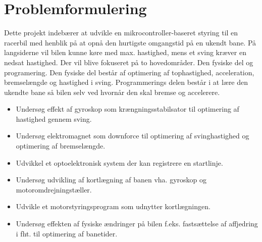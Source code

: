 
\section{Problemformulering}
Dette projekt indebærer at udvikle en mikrocontroller-baseret styring til en racerbil med henblik på at opnå den hurtigste omgangstid på en ukendt bane.
På langsiderne vil bilen kunne køre med max. hastighed, mens et sving kræver en nedsat hastighed.
Der vil blive fokuseret på to hovedområder. Den fysiske del og programering. Den fysiske del består af optimering af tophastighed, acceleration, bremselængde og hastighed i sving.
Programmerings delen består i at lære den ukendte bane så bilen selv ved hvornår den skal bremse og accelerere.
\begin{itemize}
\item Undersøg effekt af gyroskop som krængningsstabilsator til optimering af hastighed gennem sving.
\item Undersøg elektromagnet som downforce til optimering af svinghastighed og optimering af bremselængde.
\item Udvikkel et optoelektronisk system der kan registrere en startlinje.
\item Undersøg udvikling af kortlægning af banen vha. gyroskop og motoromdrejningstæller.
\item Udvikle et motorstyringsprogram som udnytter kortlægningen.
\item Undersøg effekten af fysiske ændringer på bilen f.eks. fastsættelse af affjedring i fht. til optimering af banetider.
\end{itemize}
